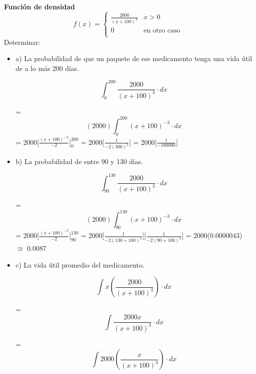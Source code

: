\documentclass{oxmathproblems}
\begin{document}
\begin{questions}

\miquestion\textbf{Función de densidad}
\[   
f(x) = 
     \begin{cases}
       \frac{2000}{(x+100)^3} & x > 0 \\
       0 & \text{en otro caso} \\
     \end{cases}
\]
$$$$
Determinar: 
\begin{itemize}
\item  a) La probabilidad de que un paquete de ese medicamento tenga una vida útil de a lo más 200 días. 


 \begin{equation}
\int_{0}^{200} \frac{2000}{(x+100)^3} \cdot dx
\end{equation}

= \begin{equation}
(2000 )\int_{0}^{200} (x+100)^{-3} \cdot dx
\end{equation}
= 2000[$\frac{(x+100)^{-2}}{-2}]^{200}_{0}$  = 
2000[$\frac{1}{-2(300)^2}]$ = 
2000[$\frac{1}{-180 000}]$


\item  b) La probabilidad de entre 90 y 130 días.


 \begin{equation}
\int_{90}^{130} \frac{2000}{(x+100)^3} \cdot dx
\end{equation}

= \begin{equation}
(2000 )\int_{90}^{130} (x+100)^{-3} \cdot dx
\end{equation}
= 2000[$\frac{(x+100)^{-2}}{-2}]^{130}_{90}$  = 
2000[$\frac{1}{-2(130 + 100)^2}]$[$\frac{1}{-2(90 + 100)^2}]$ = 
2000(0.0000043) $\cong$ 0.0087

\item  c) La vida útil promedio del medicamento. 

 \begin{equation}
\int x(\frac{2000}{(x+100)^3}) \cdot dx
\end{equation}

=  \begin{equation}
\int \frac{2000x}{(x+100)^3} \cdot dx
\end{equation}

=   \begin{equation}
\int 2000 (\frac{x}{(x+100)^3}) \cdot dx
\end{equation}


\end{itemize}
\end{questions}
\end{document}
